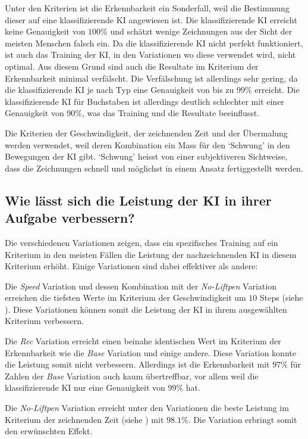 Unter den Kriterien ist die Erkennbarkeit ein Sonderfall, weil die Bestimmung
dieser auf eine klassifizierende KI angewiesen ist. Die klassifizierende KI
erreicht keine Genauigkeit von $100\%$ und schätzt wenige Zeichnungen aus der
Sicht der meisten Menschen falsch ein. Da die klassifizierende KI nicht perfekt
funktioniert, ist auch das Training der KI, in den Variationen wo diese
verwendet wird, nicht optimal. Aus diesem Grund sind auch die Resultate im
Kriterium der Erkennbarkeit minimal verfälscht. Die Verfälschung ist allerdings
sehr gering, da die klassifizierende KI je nach Typ eine Genauigkeit von bis zu
$99\%$ erreicht. Die klassifizierende KI für Buchstaben ist allerdings deutlich
schlechter mit einer Genauigkeit von $90\%$, was das Training und die Resultate
beeinflusst.

Die Kriterien der Geschwindigkeit, der zeichnenden Zeit und der Übermalung
werden verwendet, weil deren Kombination ein Mass für den `Schwung' in den
Bewegungen der KI gibt. `Schwung' heisst von einer subjektiveren Sichtweise, dass
die Zeichnungen schnell und möglichst in einem Ansatz fertiggestellt werden.



\subsection{Wie lässt sich die Leistung der KI in ihrer Aufgabe verbessern?}\label{subsub:d_frage_unter_3}
Die verschiedenen Variationen zeigen, dass ein spezifisches Training auf ein
Kriterium in den meisten Fällen die Leistung der nachzeichnenden KI in diesem
Kriterium erhöht. Einige Variationen sind dabei effektiver als andere:


Die \emph{Speed} Variation und dessen Kombination mit der \emph{No-Liftpen}
Variation erreichen die tiefsten Werte im Kriterium der Geschwindigkeit um $10$
Steps (siehe ). Diese Variationen können somit
die Leistung der KI in ihrem ausgewählten Kriterium verbessern.

Die \emph{Rec} Variation erreicht einen beinahe identischen Wert im Kriterium
der Erkennbarkeit wie die \emph{Base} Variation und einige andere. Diese
Variation konnte die Leistung somit nicht verbessern. Allerdings ist die
Erkennbarkeit mit $97\%$ für Zahlen der \emph{Base} Variation auch kaum
übertreffbar, vor allem weil die klassifizierende KI nur eine Genauigkeit von
$99\%$ hat.

Die \emph{No-Liftpen} Variation erreicht unter den Variationen die beste
Leistung im Kriterium der zeichnenden Zeit (siehe
) mit $98.1\%$. Die Variation erbringt somit den
erwünschten Effekt.

